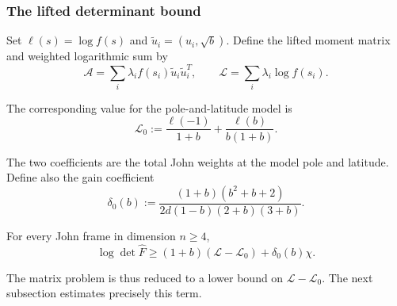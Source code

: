 \subsubsection{The lifted determinant bound}\label{sec:8.2.1}

Set $\ell(s)=\log f(s)$ and $\widetilde u_i=(u_i,\sqrt b)$.
Define the lifted moment matrix and weighted logarithmic sum by
\begin{equation}\label{eq:8.8}
\mathcal A=\sum_i\lambda_i f(s_i)\widetilde u_i\widetilde u_i^T,
\qquad \mathcal L=\sum_i\lambda_i\log f(s_i).
\end{equation}

The corresponding value for the pole-and-latitude model is
\begin{equation}\label{eq:8.9}
\mathcal L_0:=\frac{\ell(-1)}{1+b}+\frac{\ell(b)}{b(1+b)}.
\end{equation}

The two coefficients are the total John weights at the model pole and latitude.
Define also the gain coefficient
\begin{equation}\label{eq:8.10}
\delta_0(b):=\frac{(1+b)(b^2+b+2)}
{2d(1-b)(2+b)(3+b)}.
\end{equation}

\begin{lemma}\label{lem-lifted-bound}
For every John frame in dimension
$n\ge4$,
\begin{equation}\label{eq:8.11}
\log\det\widehat F
\ge (1+b)(\mathcal L-\mathcal L_0)+\delta_0(b)\chi.
\end{equation}

\end{lemma}

The matrix problem is thus reduced to a lower bound on
$\mathcal L-\mathcal L_0$. The next subsection estimates precisely this term.

